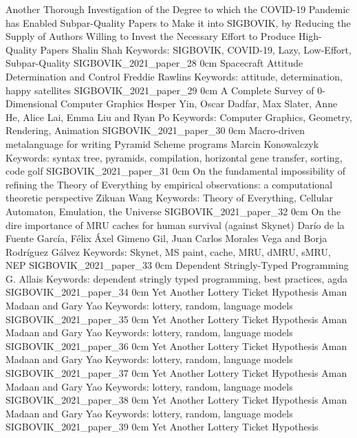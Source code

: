 \addpaper
	{Another Thorough Investigation of the Degree to which the COVID-19 Pandemic has Enabled Subpar-Quality Papers to Make it into SIGBOVIK, by Reducing the Supply of Authors Willing to Invest the Necessary Effort to Produce High-Quality Papers}
	{Shalin Shah}
	{Keywords: SIGBOVIK, COVID-19, Lazy, Low-Effort, Subpar-Quality}
	{SIGBOVIK_2021_paper_28}
	{0cm}
	{}
\addpaper
	{Spacecraft Attitude Determination and Control}
	{Freddie Rawlins}
	{Keywords: attitude, determination, happy satellites}
	{SIGBOVIK_2021_paper_29}
	{0cm}
	{}
\addpaper
	{A Complete Survey of 0-Dimensional Computer Graphics}
	{Hesper Yin, Oscar Dadfar, Max Slater, Anne He, Alice Lai, Emma Liu and Ryan Po}
	{Keywords: Computer Graphics, Geometry, Rendering, Animation}
	{SIGBOVIK_2021_paper_30}
	{0cm}
	{}
\addpaper
	{Macro-driven metalanguage for writing Pyramid Scheme programs}
	{Marcin Konowalczyk}
	{Keywords: syntax tree, pyramids, compilation, horizontal gene transfer, sorting, code golf}
	{SIGBOVIK_2021_paper_31}
	{0cm}
	{}
\addpaper
	{On the fundamental impossibility of refining the Theory of Everything by empirical observations: a computational theoretic perspective}
	{Zikuan Wang}
	{Keywords: Theory of Everything, Cellular Automaton, Emulation, the Universe}
	{SIGBOVIK_2021_paper_32}
	{0cm}
	{}
\addpaper
	{On the dire importance of MRU caches for human survival (against Skynet)}
	{Darío de la Fuente García, Félix Áxel Gimeno Gil, Juan Carlos Morales Vega and Borja Rodríguez Gálvez}
	{Keywords: Skynet, MS paint, cache, MRU, dMRU, sMRU, NEP}
	{SIGBOVIK_2021_paper_33}
	{0cm}
	{}
\addpaper
	{Dependent Stringly-Typed Programming}
	{G. Allais}
	{Keywords: dependent stringly typed programming, best practices, agda}
	{SIGBOVIK_2021_paper_34}
	{0cm}
	{}
\addpaper
	{Yet Another Lottery Ticket Hypothesis}
	{Aman Madaan and Gary Yao}
	{Keywords: lottery, random, language models}
	{SIGBOVIK_2021_paper_35}
	{0cm}
	{}
\addpaper
	{Yet Another Lottery Ticket Hypothesis}
	{Aman Madaan and Gary Yao}
	{Keywords: lottery, random, language models}
	{SIGBOVIK_2021_paper_36}
	{0cm}
	{}
\addpaper
	{Yet Another Lottery Ticket Hypothesis}
	{Aman Madaan and Gary Yao}
	{Keywords: lottery, random, language models}
	{SIGBOVIK_2021_paper_37}
	{0cm}
	{}
\addpaper
	{Yet Another Lottery Ticket Hypothesis}
	{Aman Madaan and Gary Yao}
	{Keywords: lottery, random, language models}
	{SIGBOVIK_2021_paper_38}
	{0cm}
	{}
\addpaper
	{Yet Another Lottery Ticket Hypothesis}
	{Aman Madaan and Gary Yao}
	{Keywords: lottery, random, language models}
	{SIGBOVIK_2021_paper_39}
	{0cm}
	{}
\addpaper
	{Yet Another Lottery Ticket Hypothesis}
